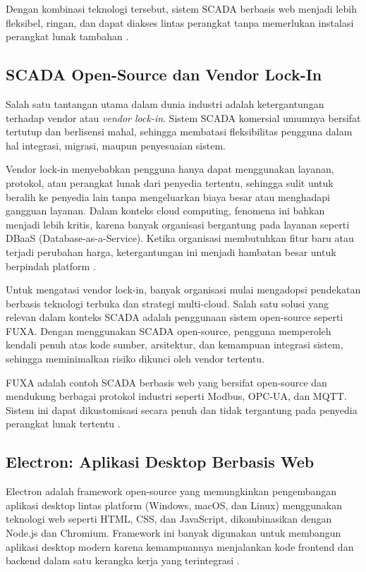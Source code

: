 Dengan kombinasi teknologi tersebut, sistem SCADA berbasis web menjadi lebih fleksibel, ringan, dan dapat diakses lintas perangkat tanpa memerlukan instalasi perangkat lunak tambahan \parencite{seeed2024fuxa}.

\subsection{SCADA Open-Source dan Vendor Lock-In}
Salah satu tantangan utama dalam dunia industri adalah ketergantungan terhadap vendor atau \textit{vendor lock-in}. Sistem SCADA komersial umumnya bersifat tertutup dan berlisensi mahal, sehingga membatasi fleksibilitas pengguna dalam hal integrasi, migrasi, maupun penyesuaian sistem.

Vendor lock-in menyebabkan pengguna hanya dapat menggunakan layanan, protokol, atau perangkat lunak dari penyedia tertentu, sehingga sulit untuk beralih ke penyedia lain tanpa mengeluarkan biaya besar atau menghadapi gangguan layanan. Dalam konteks cloud computing, fenomena ini bahkan menjadi lebih kritis, karena banyak organisasi bergantung pada layanan seperti DBaaS (Database-as-a-Service). Ketika organisasi membutuhkan fitur baru atau terjadi perubahan harga, ketergantungan ini menjadi hambatan besar untuk berpindah platform \parencite{banthia2024vendorlockin}.

Untuk mengatasi vendor lock-in, banyak organisasi mulai mengadopsi pendekatan berbasis teknologi terbuka dan strategi multi-cloud. Salah satu solusi yang relevan dalam konteks SCADA adalah penggunaan sistem open-source seperti FUXA. Dengan menggunakan SCADA open-source, pengguna memperoleh kendali penuh atas kode sumber, arsitektur, dan kemampuan integrasi sistem, sehingga meminimalkan risiko dikunci oleh vendor tertentu.

FUXA adalah contoh SCADA berbasis web yang bersifat open-source dan mendukung berbagai protokol industri seperti Modbus, OPC-UA, dan MQTT. Sistem ini dapat dikustomisasi secara penuh dan tidak tergantung pada penyedia perangkat lunak tertentu \parencite{seeed2024fuxa}.

\subsection{Electron: Aplikasi Desktop Berbasis Web}
Electron adalah framework open-source yang memungkinkan pengembangan aplikasi desktop lintas platform (Windows, macOS, dan Linux) menggunakan teknologi web seperti HTML, CSS, dan JavaScript, dikombinasikan dengan Node.js dan Chromium. Framework ini banyak digunakan untuk membangun aplikasi desktop modern karena kemampuannya menjalankan kode frontend dan backend dalam satu kerangka kerja yang terintegrasi \parencite{electron2024why}.

